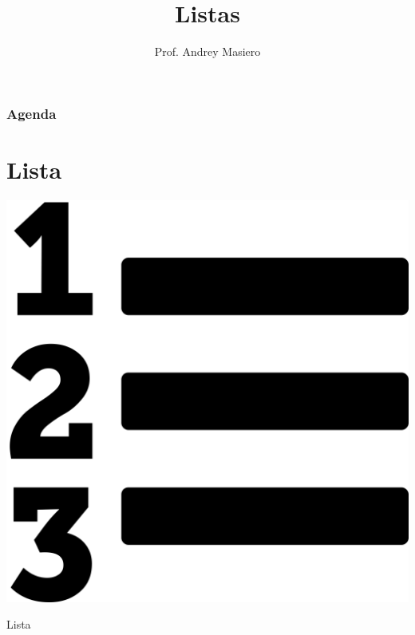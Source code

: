 \documentclass{beamer}
\begin{document}
\title[Listas]{Listas}
\author{Prof. Andrey Masiero}

\begin{frame}
  \titlepage
\end{frame}

\begin{frame}
  \frametitle{Agenda}
  \tableofcontents
\end{frame}

\section{Lista}

\begin{frame}
	\begin{center}
        \includegraphics[scale=0.2]{images/list.png}

		\Huge Lista
	\end{center}
\end{frame}
\end{document}
